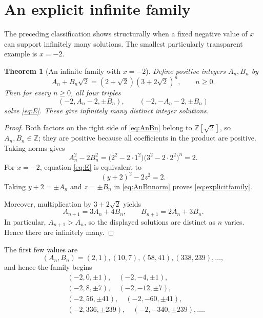 \documentclass[11pt,a4paper]{amsart}
\numberwithin{equation}{section}
\newtheorem{theorem}{Theorem}[section]
\theoremstyle{definition}
\newcommand{\Z}{\mathbb Z}
\begin{document}
\section{An explicit infinite family}

The preceding classification shows structurally when a fixed negative
value of \(x\) can support infinitely many solutions.  The smallest
particularly transparent example is \(x=-2\).

\begin{theorem}[An infinite family with \(x=-2\)]\label{thm:infinitefamily}
Define positive integers \(A_n,B_n\) by
\begin{equation}
 A_n+B_n\sqrt2=(2+\sqrt2)(3+2\sqrt2)^n,
 \qquad n\ge0.
 \label{eq:AnBn}
\end{equation}
Then for every \(n\ge0\), all four triples
\begin{equation}
 (-2,A_n-2,\pm B_n),
 \qquad
 (-2,-A_n-2,\pm B_n)
 \label{eq:explicitfamily}
\end{equation}
solve \eqref{eq:E}.  These give infinitely many distinct integer
solutions.
\end{theorem}

\begin{proof}
Both factors on the right side of \eqref{eq:AnBn} belong to
\(\Z[\sqrt2]\), so \(A_n,B_n\in\Z\); they are positive because all
coefficients in the product are positive.  Taking norms gives
\begin{equation}
 A_n^2-2B_n^2
 =\bigl(2^2-2\cdot1^2\bigr)
  \bigl(3^2-2\cdot2^2\bigr)^n
 =2.
 \label{eq:AnBnnorm}
\end{equation}
For \(x=-2\), equation \eqref{eq:E} is equivalent to
\begin{equation}
 (y+2)^2-2z^2=2.
 \label{eq:xminus2pell}
\end{equation}
Taking \(y+2=\pm A_n\) and \(z=\pm B_n\) in
\eqref{eq:AnBnnorm} proves \eqref{eq:explicitfamily}.

Moreover, multiplication by \(3+2\sqrt2\) yields
\begin{equation}
 A_{n+1}=3A_n+4B_n,
 \qquad B_{n+1}=2A_n+3B_n.
 \label{eq:AnBnrec}
\end{equation}
In particular, \(A_{n+1}>A_n\), so the displayed solutions are
distinct as \(n\) varies.  Hence there are infinitely many.
\end{proof}

The first few values are
\begin{equation*}
 (A_n,B_n)=(2,1),(10,7),(58,41),(338,239),\ldots,
\end{equation*}
and hence the family begins
\begin{align*}
 &(-2,0,\pm1),\quad (-2,-4,\pm1),\\
 &(-2,8,\pm7),\quad (-2,-12,\pm7),\\
 &(-2,56,\pm41),\quad (-2,-60,\pm41),\\
 &(-2,336,\pm239),\quad (-2,-340,\pm239),\ldots.
\end{align*}
\end{document}
